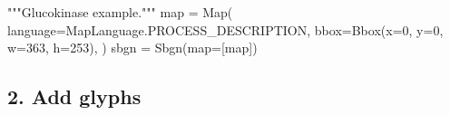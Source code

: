 \documentclass[
  letterpaper,
  DIV=11,
  numbers=noendperiod]{scrartcl}
\newenvironment{Shaded}{\begin{snugshade}}{\end{snugshade}}
\newcommand{\BuiltInTok}[1]{\textcolor[rgb]{0.00,0.23,0.31}{#1}}
\newcommand{\CommentTok}[1]{\textcolor[rgb]{0.37,0.37,0.37}{#1}}
\newcommand{\DecValTok}[1]{\textcolor[rgb]{0.68,0.00,0.00}{#1}}
\newcommand{\NormalTok}[1]{\textcolor[rgb]{0.00,0.23,0.31}{#1}}
\newcommand{\OperatorTok}[1]{\textcolor[rgb]{0.37,0.37,0.37}{#1}}
\begin{document}
\begin{Shaded}
\begin{Highlighting}[]
\CommentTok{"""Glucokinase example."""}
\BuiltInTok{map} \OperatorTok{=}\NormalTok{ Map(}
\NormalTok{    language}\OperatorTok{=}\NormalTok{MapLanguage.PROCESS\_DESCRIPTION,}
\NormalTok{    bbox}\OperatorTok{=}\NormalTok{Bbox(x}\OperatorTok{=}\DecValTok{0}\NormalTok{, y}\OperatorTok{=}\DecValTok{0}\NormalTok{, w}\OperatorTok{=}\DecValTok{363}\NormalTok{, h}\OperatorTok{=}\DecValTok{253}\NormalTok{),}
\NormalTok{)}
\NormalTok{sbgn }\OperatorTok{=}\NormalTok{ Sbgn(}\BuiltInTok{map}\OperatorTok{=}\NormalTok{[}\BuiltInTok{map}\NormalTok{])}
\end{Highlighting}
\end{Shaded}

\subsection{2. Add glyphs}\label{add-glyphs}
\end{document}
